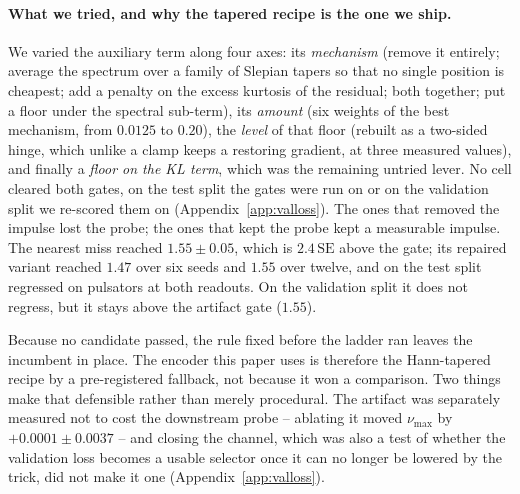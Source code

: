 \documentclass{article}
\begin{document}
\paragraph{What we tried, and why the tapered recipe is the one we ship.} We varied the auxiliary
term along four axes: its \emph{mechanism} (remove it entirely; average the spectrum over a family of
Slepian tapers so that no single position is cheapest; add a penalty on the excess kurtosis of the
residual; both together; put a floor under the spectral sub-term), its \emph{amount} (six weights of
the best mechanism, from $0.0125$ to $0.20$), the \emph{level} of that floor (rebuilt as a two-sided
hinge, which unlike a clamp keeps a restoring gradient, at three measured values), and finally a
\emph{floor on the KL term}, which was the remaining untried lever. No cell cleared both gates, on
the test split the gates were run on or on the validation split we re-scored them on
(Appendix~\ref{app:valloss}). The
ones that removed the impulse lost the probe; the ones that kept the probe kept a measurable impulse.
The nearest miss reached $1.55 \pm 0.05$, which is $2.4\,\mathrm{SE}$ above the gate; its repaired
variant reached $1.47$ over six seeds and $1.55$ over twelve, and on the test split regressed on
pulsators at both readouts. On the validation split it does not regress, but it stays above the
artifact gate ($1.55$).

Because no candidate passed, the rule fixed before the ladder ran leaves the incumbent in place. The
encoder this paper uses is therefore the Hann-tapered recipe by a pre-registered fallback, not
because it won a comparison. Two things make that defensible rather than merely procedural. The
artifact was separately measured not to cost the downstream probe -- ablating it moved $\nu_{\max}$
by $+0.0001 \pm 0.0037$ -- and closing the channel, which was also a test of whether the validation
loss becomes a usable selector once it can no longer be lowered by the trick, did not make it one
(Appendix~\ref{app:valloss}).
\end{document}
